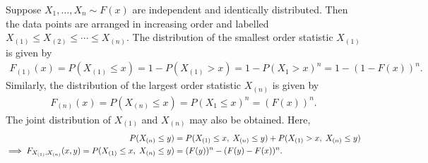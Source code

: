 Suppose $X_{1},\ldots,X_{n} \sim F(x)$ are independent and identically distributed. Then the data points are arranged in increasing order and labelled $X_{(1)} \leq X_{(2)} \leq \cdots \leq X_{(n)}$. The distribution of the smallest order statistic $X_{(1)}$ is given by
\begin{align}
    F_{(1)}(x) = P(X_{(1)} \leq x) = 1 - P(X_{(1)} > x) = 1 - P(X_{1} > x)^{n} = 1 - (1 - F(x))^{n}.
\end{align}
Similarly, the distribution of the largest order statistic $X_{(n)}$ is given by
\begin{align}
    F_{(n)}(x) = P(X_{(n)} \leq x) = P(X_{1} \leq x)^{n} = (F(x))^{n}.
\end{align}
The joint distribution of $X_{(1)}$ and $X_{(n)}$ may also be obtained. Here,
\begin{align}
    P(X_{(n)} \leq y) &= P(X_{(1)} \leq x,\;X_{(n)} \leq y) + P(X_{(1)} > x,\;X_{(n)} \leq y) \notag \\
    \implies F_{X_{(1)},X_{(n)}}(x,y) = P(X_{(1)}\leq x,\;X_{(n)} \leq y) &= (F(y))^{n} - (F(y)-F(x))^{n}.
\end{align}